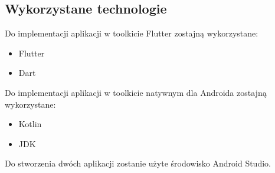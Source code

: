 \documentclass[12pt,a4paper]{article}
\begin{document}
\subsection{Wykorzystane technologie}
Do implementacji aplikacji w toolkicie Flutter zostajną wykorzystane:
\begin{itemize}
    \item Flutter
    \item Dart
\end{itemize}

Do implementacji aplikacji w toolkicie natywnym dla Androida zostajną wykorzystane:
\begin{itemize}
    \item Kotlin
    \item JDK
\end{itemize}

Do stworzenia dwóch aplikacji zostanie użyte środowisko Android Studio.
\end{document}
